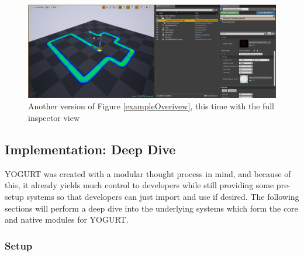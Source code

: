 \documentclass[journal]{IEEEtran}
\begin{document}
\begin{figure}
\includegraphics[width=\textwidth]{"scene_yogurt_postrun"}
\caption{Another version of Figure \ref{exampleOverivew}, this time with the full inspector view}
\label{exampleOverivewLarge}
\end{figure}

\subsection{Implementation: Deep Dive}

YOGURT was created with a modular thought process in mind, and because of this, it already yields much control to developers while still providing some pre-setup systems so that developers can just import and use if desired. The following sections will perform a deep dive into the underlying systems which form the core and native modules for YOGURT.

\subsubsection{Setup}
\end{document}
